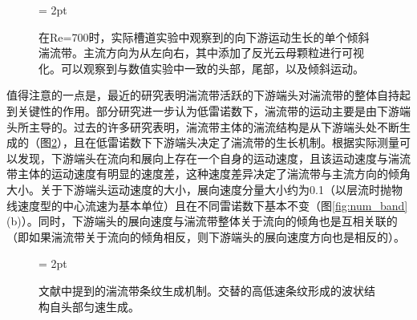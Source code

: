 \begin{figure}[H]
	\subfigbottomskip = 2pt
	\begin{minipage}[h]{\linewidth}
	\centering
	\end{minipage}
	\quad
	\caption{在Re=700时，实际槽道实验中观察到的向下游运动生长的单个倾斜湍流带。主流方向为从左向右，其中添加了反光云母颗粒进行可视化\cite{Paranjape2020}。可以观察到与数值实验中一致的头部，尾部，以及倾斜运动。}
\label{fig:exp_band}
\end{figure}

值得注意的一点是，最近的研究表明湍流带活跃的下游端头对湍流带的整体自持起到关键性的作用。部分研究\cite{Kanazawa2018, Paranjape2019, Shimizu2019, Xiao2020}进一步认为低雷诺数下，湍流带的运动主要是由下游端头所主导的。过去的许多研究表明，湍流带主体的湍流结构是从下游端头处不断生成的（图\ref{fig:band_generation}），且在低雷诺数下下游端头决定了湍流带的生长机制\cite{Paranjape2019, Shimizu2019, Xiao2020, Song2020, Liu2020}。根据实际测量可以发现，下游端头在流向和展向上存在一个自身的运动速度，且该运动速度与湍流带主体的运动速度有明显的速度差，这种速度差异决定了湍流带与主流方向的倾角大小\cite{Xiao2020b}。关于下游端头运动速度的大小，展向速度分量大小约为0.1（以层流时抛物线速度型的中心流速为基本单位）且在不同雷诺数下基本不变（图\ref{fig:num_band}(b)）。同时，下游端头的展向速度与湍流带整体关于流向的倾角也是互相关联的\cite{Paranjape2019,Shimizu2019,Xiao2020}（即如果湍流带关于流向的倾角相反，则下游端头的展向速度方向也是相反的）。

\begin{figure}[htb]
	\subfigbottomskip = 2pt
	\begin{minipage}[h]{\linewidth}
	\centering
	\end{minipage}
	\quad
	\caption{文献\cite{Xiao2020}中提到的湍流带条纹生成机制。交替的高低速条纹形成的波状结构自头部匀速生成。}
\label{fig:band_generation}
\end{figure}

